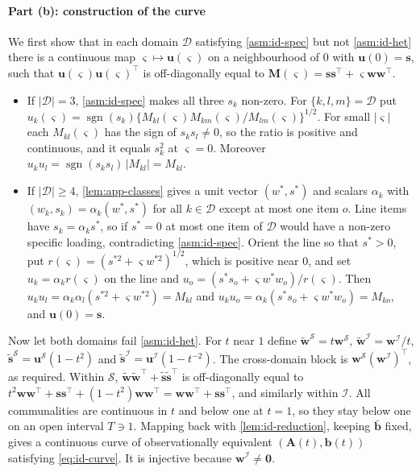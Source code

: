 \paragraph{Part (b): construction of the curve}
We first show that in each domain $\mathcal D$ satisfying \cref{asm:id-spec} but not \cref{asm:id-het} there is a continuous map $\varsigma\mapsto\bm u(\varsigma)$ on a neighbourhood of $0$ with $\bm u(0)=\bm s$, such that $\bm u(\varsigma)\bm u(\varsigma)^\top$ is off-diagonally equal to $\bm M(\varsigma)=\bm s\bm s^\top+\varsigma\bm w\bm w^\top$.
\begin{itemize}
  \item If $|\mathcal D|=3$, \cref{asm:id-spec} makes all three $s_k$ non-zero. For $\{k,l,m\}=\mathcal D$ put $u_k(\varsigma)=\operatorname{sgn}(s_k)\{M_{kl}(\varsigma)M_{km}(\varsigma)/M_{lm}(\varsigma)\}^{1/2}$. For small $|\varsigma|$ each $M_{kl}(\varsigma)$ has the sign of $s_ks_l\neq0$, so the ratio is positive and continuous, and it equals $s_k^2$ at $\varsigma=0$. Moreover $u_ku_l=\operatorname{sgn}(s_ks_l)\,|M_{kl}|=M_{kl}$.
  \item If $|\mathcal D|\ge4$, \cref{lem:app-classes} gives a unit vector $(w^*,s^*)$ and scalars $\alpha_k$ with $(w_k,s_k)=\alpha_k(w^*,s^*)$ for all $k\in\mathcal D$ except at most one item $o$. Line items have $s_k=\alpha_ks^*$, so if $s^*=0$ at most one item of $\mathcal D$ would have a non-zero specific loading, contradicting \cref{asm:id-spec}. Orient the line so that $s^*>0$, put $r(\varsigma)=(s^{*2}+\varsigma w^{*2})^{1/2}$, which is positive near $0$, and set $u_k=\alpha_kr(\varsigma)$ on the line and $u_o=(s^*s_o+\varsigma w^*w_o)/r(\varsigma)$. Then $u_ku_l=\alpha_k\alpha_l(s^{*2}+\varsigma w^{*2})=M_{kl}$ and $u_ku_o=\alpha_k(s^*s_o+\varsigma w^*w_o)=M_{ko}$, and $\bm u(0)=\bm s$.
\end{itemize}
Now let both domains fail \cref{asm:id-het}. For $t$ near $1$ define $\tilde{\bm w}^{\mathcal S}=t\bm w^{\mathcal S}$, $\tilde{\bm w}^{\mathcal I}=\bm w^{\mathcal I}/t$, $\tilde{\bm s}^{\mathcal S}=\bm u^{\mathcal S}(1-t^2)$ and $\tilde{\bm s}^{\mathcal I}=\bm u^{\mathcal I}(1-t^{-2})$. The cross-domain block is $\bm w^{\mathcal S}(\bm w^{\mathcal I})^\top$, as required. Within $\mathcal S$, $\tilde{\bm w}\tilde{\bm w}^\top+\tilde{\bm s}\tilde{\bm s}^\top$ is off-diagonally equal to $t^2\bm w\bm w^\top+\bm s\bm s^\top+(1-t^2)\bm w\bm w^\top=\bm w\bm w^\top+\bm s\bm s^\top$, and similarly within $\mathcal I$. All communalities are continuous in $t$ and below one at $t=1$, so they stay below one on an open interval $T\ni1$. Mapping back with \cref{lem:id-reduction}, keeping $\bar{\bm b}$ fixed, gives a continuous curve of observationally equivalent $(\bm A(t),\bm b(t))$ satisfying \eqref{eq:id-curve}. It is injective because $\bm w^{\mathcal I}\neq\bm0$.


